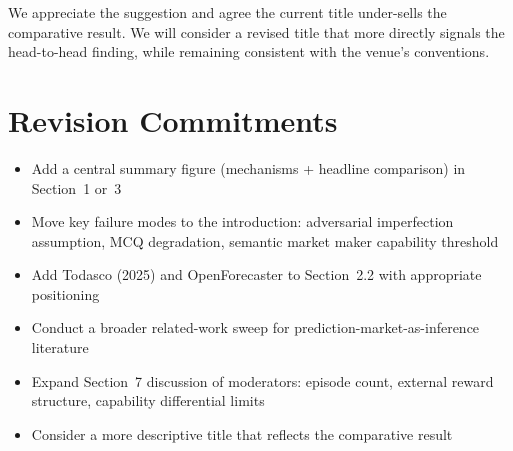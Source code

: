\documentclass[10pt]{article}
\begin{document}
We appreciate the suggestion and agree the current title under-sells the
comparative result. We will consider a revised title that more directly signals
the head-to-head finding, while remaining consistent with the venue's conventions.

\section*{Revision Commitments}

\begin{itemize}[noitemsep, topsep=2pt, leftmargin=*]
  \item Add a central summary figure (mechanisms + headline comparison) in
        Section~1 or~3
  \item Move key failure modes to the introduction: adversarial imperfection
        assumption, MCQ degradation, semantic market maker capability threshold
  \item Add Todasco (2025) and OpenForecaster to Section~2.2 with appropriate
        positioning
  \item Conduct a broader related-work sweep for prediction-market-as-inference
        literature
  \item Expand Section~7 discussion of moderators: episode count, external
        reward structure, capability differential limits
  \item Consider a more descriptive title that reflects the comparative result
\end{itemize}
\end{document}
